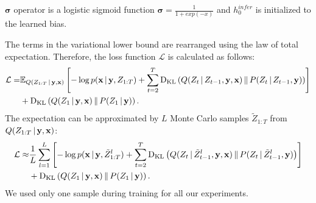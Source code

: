 \documentclass{article} %
\newcommand{\comm}[1]{}
\newcommand{\given}{\,|\,}
\newcommand{\expectation}{\mathbb{E}}
\newcommand{\kldiv}{\mathrm{D}_{\rm KL}}
\newcommand{\klBars}{\,\|\,}
\newcommand{\sigmoid}{\boldsymbol{\sigma}}
\newcommand{\hdec}{h^{gen}}
\newcommand{\henc}{h^{infer}}
\newcommand{\Lat}{Z}
\newcommand{\numSamples}{L}
\newcommand{\sampleIdx}{l}
\newcommand{\LatSample}{\tilde{Z}}
\newcommand{\icaption}{{\bf{y}}}
\newcommand{\oimage}{{\bf{x}}}
\newcommand{\post}{Q}
\newcommand{\prior}{P}
\newcommand{\loss}{\mathcal{L}}
\newcommand{\lloss}{\mathcal{L}^{z}}
\begin{document}

$\sigmoid$ operator is a logistic sigmoid function $\sigmoid=\frac{1}{1+exp(-x)}$ and $\henc_0$ is initialized to the learned bias. 

The terms in the variational lower bound are rearranged using the law of total expectation. Therefore, the loss function $\loss$ is calculated as follows:
\begin{align}
\loss =  &\expectation_{Q(\Lat_{1:T}\given\icaption,\oimage)}\left[ - \log p(\oimage\given\icaption,\Lat_{1:T}) + \sum_{t=2}^T\kldiv\left(\post(\Lat_t\given\Lat_{t-1},\icaption,\oimage)\klBars\prior(\Lat_t\given\Lat_{t-1},\icaption)\right) \right] \nonumber \\& + \kldiv\left(\post(\Lat_1\given\icaption,\oimage)\klBars\prior(\Lat_1\given\icaption)\right).
\end{align}
The expectation can be approximated by $\numSamples$ Monte Carlo samples $\LatSample_{1:T}$ from $\post(\Lat_{1:T}\given\icaption, \oimage)$:
\begin{align}
\loss \approx  &\frac{1}{\numSamples}\sum_{\sampleIdx=1}^\numSamples\left[ - \log p(\oimage\given\icaption,\LatSample^\sampleIdx_{1:T}) + \sum_{t=2}^T\kldiv\left(\post(\Lat_t\given\LatSample^\sampleIdx_{t-1},\icaption,\oimage)\klBars\prior(\Lat_t\given\LatSample^\sampleIdx_{t-1},\icaption)\right) \right] \nonumber \\& + \kldiv\left(\post(\Lat_1\given\icaption,\oimage)\klBars\prior(\Lat_1\given\icaption)\right).
\end{align}
We used only one sample during training for all our experiments.
\comm{
\begin{align}
\loss &= -\sum_{t=1}^{T}D_{KL}(\post(\Lat_t|\henc_t,s_{t-1})\,||\,\prior(\Lat_t)) + \frac{1}{L}\sum_{l=1}^{L}log\,p(x_{t}|y,z)\\
&=
\frac{1}{2}\sum_{t=1}^{T}(1 - 2\,log\,\sigma_{t}^{prior} + 2\,log\,\sigma_{t} - \frac{exp(2\,log\,\sigma_{t}) + (\mu_{t} - \mu_{t}^{prior})^{2}}{exp(2\,log\,\sigma_{t}^{prior})}) + \frac{1}{L}\sum_{l=1}^{L}log\,p(x_{t}|y,z)
\end{align}
}
\end{document}
